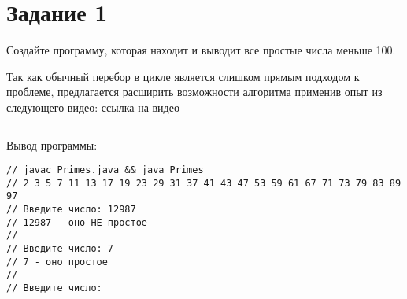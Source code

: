 \chapter*{Задание 1}
\label{ch:Task1}
Создайте программу, которая находит и выводит все простые числа меньше 100.

Так как обычный перебор в цикле является слишком прямым подходом к проблеме, предлагается расширить возможности алгоритма применив опыт из следующего видео: \href{https://www.youtube.com/watch?v=tBzaMfV94uA}{ссылка на видео}


\inputminted{java}{../src/part1/Primes.java}

Вывод программы:
\begin{verbatim}
// javac Primes.java && java Primes
// 2 3 5 7 11 13 17 19 23 29 31 37 41 43 47 53 59 61 67 71 73 79 83 89 97
// Введите число: 12987
// 12987 - оно НЕ простое
// 
// Введите число: 7
// 7 - оно простое
// 
// Введите число:

\end{verbatim}

\endinput

